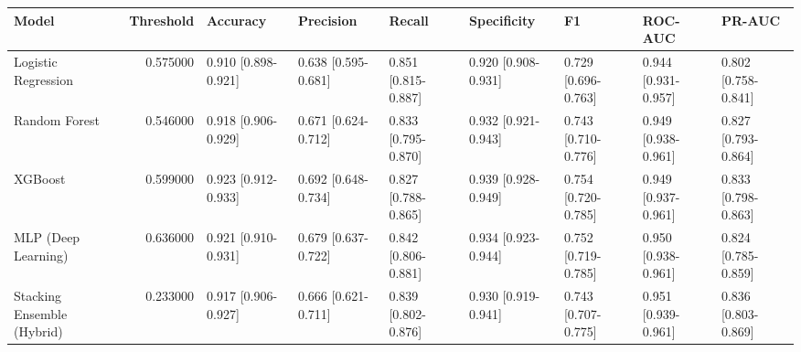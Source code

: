 \begin{tabular}{lrlllllll}
\toprule
Model & Threshold & Accuracy & Precision & Recall & Specificity & F1 & ROC-AUC & PR-AUC \\
\midrule
Logistic Regression & 0.575000 & 0.910 [0.898-0.921] & 0.638 [0.595-0.681] & 0.851 [0.815-0.887] & 0.920 [0.908-0.931] & 0.729 [0.696-0.763] & 0.944 [0.931-0.957] & 0.802 [0.758-0.841] \\
Random Forest & 0.546000 & 0.918 [0.906-0.929] & 0.671 [0.624-0.712] & 0.833 [0.795-0.870] & 0.932 [0.921-0.943] & 0.743 [0.710-0.776] & 0.949 [0.938-0.961] & 0.827 [0.793-0.864] \\
XGBoost & 0.599000 & 0.923 [0.912-0.933] & 0.692 [0.648-0.734] & 0.827 [0.788-0.865] & 0.939 [0.928-0.949] & 0.754 [0.720-0.785] & 0.949 [0.937-0.961] & 0.833 [0.798-0.863] \\
MLP (Deep Learning) & 0.636000 & 0.921 [0.910-0.931] & 0.679 [0.637-0.722] & 0.842 [0.806-0.881] & 0.934 [0.923-0.944] & 0.752 [0.719-0.785] & 0.950 [0.938-0.961] & 0.824 [0.785-0.859] \\
Stacking Ensemble (Hybrid) & 0.233000 & 0.917 [0.906-0.927] & 0.666 [0.621-0.711] & 0.839 [0.802-0.876] & 0.930 [0.919-0.941] & 0.743 [0.707-0.775] & 0.951 [0.939-0.961] & 0.836 [0.803-0.869] \\
\bottomrule
\end{tabular}
